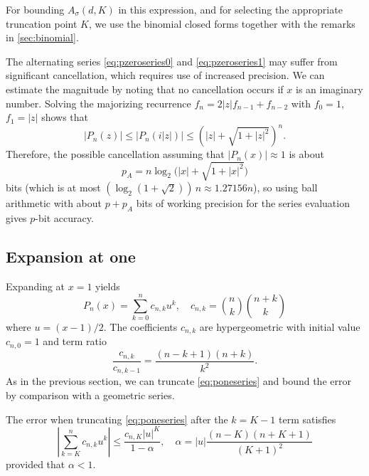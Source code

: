 \documentclass[nohypdvips,review]{siamart0216}
\begin{document}
For bounding $A_{\sigma}(d,K)$ in this expression,
and for selecting the appropriate truncation point $K$,
we use
the binomial closed forms together with the remarks
in \cref{sec:binomial}.

The alternating series \cref{eq:pzeroseries0} and \cref{eq:pzeroseries1}
may suffer from significant cancellation, which requires use of
increased precision.
We can estimate the magnitude by
noting that no cancellation occurs
if $x$ is an imaginary number.
Solving the majorizing recurrence $f_n = 2 |z| f_{n-1} + f_{n-2}$ with
$f_0 = 1$, $f_1 = |z|$ shows that
\[ |P_n(z)| \le |P_n(i|z|)| \le \left(|z| + \sqrt{1 + |z|^2}\right)^n. \]
Therefore, the possible cancellation assuming that $|P_n(x)| \approx 1$
is about
\begin{equation}
p_A = n \log_2\bigl(|x| + \sqrt{1 + |x|^2}\bigr)
\end{equation}
bits (which is at most $(\log_2 (1+\sqrt{2})) \, n \approx 1.27156n$),
so using ball arithmetic with about $p + p_A$ bits of working precision
for the series evaluation gives $p$-bit accuracy.

\subsection{Expansion at one}

\label{sec:series-one}

Expanding at $x = 1$ yields
\begin{equation}
\label{eq:poneseries}
P_n(x) = \sum_{k=0}^n c_{n,k} u^k, \quad c_{n,k} = {n \choose k} {n+k \choose k}
\end{equation}
where $u = (x-1)/2$.
The coefficients $c_{n,k}$ are hypergeometric with initial value $c_{n,0} = 1$
and term ratio
\begin{equation}
\label{eq:poneprec}
\frac{c_{n,k}}{c_{n,k-1}} = \frac{(n-k+1)(n+k)}{k^2}.
\end{equation}
As in the previous section, we can truncate \cref{eq:poneseries} and
bound the error by comparison with a geometric series.

\begin{proposition}
\label{prop:poneseries}
The error when truncating \cref{eq:poneseries} after the $k = K - 1$ term satisfies
\begin{equation}
\label{eq:truncerr2}
\left| \sum_{k=K}^n c_{n,k} u^k \right| \le \frac{c_{n,K} |u|^K}{1-\alpha},
\quad\!\! \alpha = |u| \frac{(n-K)(n+K+1)}{(K+1)^2}
\end{equation}
provided that $\alpha < 1$.
\end{proposition}
\end{document}
